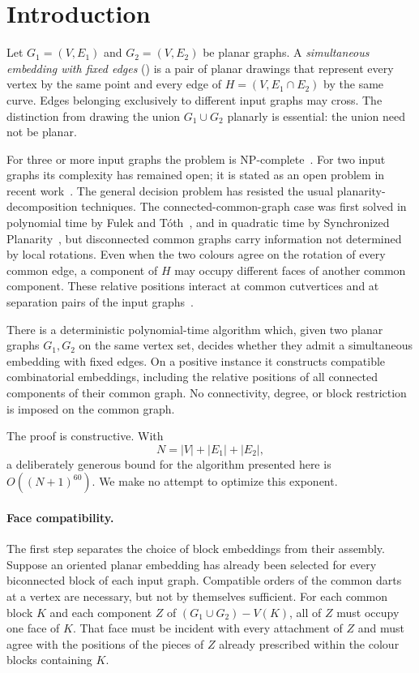 \section{Introduction}
\label{sec:introduction}

Let $G_1=(V,E_1)$ and $G_2=(V,E_2)$ be planar graphs.  A
\emph{simultaneous embedding with fixed edges} (\SEFE) is a pair of planar
drawings that represent every vertex by the same point and every edge of
$H=(V,E_1\cap E_2)$ by the same curve.  Edges belonging exclusively to
different input graphs may cross.  The distinction from drawing the union
$G_1\cup G_2$ planarly is essential: the union need not be planar.

For three or more input graphs the problem is
NP-complete~\cite{gjpss06}.  For two input graphs its complexity has
remained open; it is stated as an open problem in recent
work~\cite{fpr,isaac,ramsey}.  The general decision problem has resisted the
usual planarity-decomposition techniques.  The connected-common-graph case
was first solved in polynomial time by Fulek and T\'oth~\cite{atomic}, and
in quadratic time by Synchronized Planarity~\cite[Theorem~16]{bfr}, but
disconnected common graphs carry information not determined by local
rotations.  Even when the two
colours agree on the rotation of every common edge, a component of $H$ may
occupy different faces of another common component.  These relative
positions interact at common cutvertices and at separation pairs of the
input graphs~\cite{brdisconnect,bkr}.

\begin{theorem}\label{thm:main}
There is a deterministic polynomial-time algorithm which, given two planar
graphs $G_1,G_2$ on the same vertex set, decides whether they admit a
simultaneous embedding with fixed edges.  On a positive instance it
constructs compatible combinatorial embeddings, including the relative
positions of all connected components of their common graph.  No
connectivity, degree, or block restriction is imposed on the common graph.
\end{theorem}

The proof is constructive.  With
\[
 N=|V|+|E_1|+|E_2|,
\]
a deliberately generous bound for the algorithm presented here is
$O((N+1)^{60})$.  We make no attempt to optimize this exponent.

\paragraph{Face compatibility.}
The first step separates the choice of block embeddings from their
assembly.  Suppose an oriented planar embedding has already been selected
for every biconnected block of each input graph.  Compatible orders of the
common darts at a vertex are necessary, but not by themselves sufficient.
For each common block $K$ and each component $Z$ of
$(G_1\cup G_2)-V(K)$, all of $Z$ must occupy one face of $K$.  That face
must be incident with every attachment of $Z$ and must agree with the
positions of the pieces of $Z$ already prescribed within the colour
blocks containing $K$.

